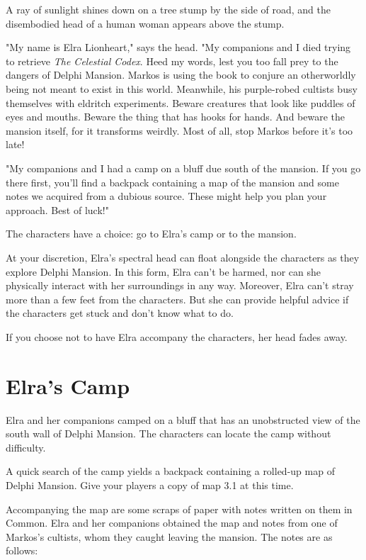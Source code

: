 \documentclass[10pt,a4paper,twoside,bg=print,twocolumn,openany,nodeprecatedcode]{dndbook}
\begin{document}
\begin{DndReadAloud}{}
A ray of sunlight shines down on a tree stump by the side of road, and the disembodied head of a human woman appears above the stump.

"My name is Elra Lionheart," says the head. "My companions and I died trying to retrieve \textit{The Celestial Codex}. Heed my words, lest you too fall prey to the dangers of Delphi Mansion. Markos is using the book to conjure an otherworldly being not meant to exist in this world. Meanwhile, his purple-robed cultists busy themselves with eldritch experiments. Beware creatures that look like puddles of eyes and mouths. Beware the thing that has hooks for hands. And beware the mansion itself, for it transforms weirdly. Most of all, stop Markos before it's too late!

"My companions and I had a camp on a bluff due south of the mansion. If you go there first, you'll find a backpack containing a map of the mansion and some notes we acquired from a dubious source. These might help you plan your approach. Best of luck!"

\end{DndReadAloud}

The characters have a choice: go to Elra's camp or to the mansion.

At your discretion, Elra's spectral head can float alongside the characters as they explore Delphi Mansion. In this form, Elra can't be harmed, nor can she physically interact with her surroundings in any way. Moreover, Elra can't stray more than a few feet from the characters. But she can provide helpful advice if the characters get stuck and don't know what to do.

If you choose not to have Elra accompany the characters, her head fades away.

\section{Elra's Camp}
Elra and her companions camped on a bluff that has an unobstructed view of the south wall of Delphi Mansion. The characters can locate the camp without difficulty.

A quick search of the camp yields a backpack containing a rolled-up map of Delphi Mansion. Give your players a copy of map 3.1 at this time.

Accompanying the map are some scraps of paper with notes written on them in Common. Elra and her companions obtained the map and notes from one of Markos's cultists, whom they caught leaving the mansion. The notes are as follows:
\end{document}
